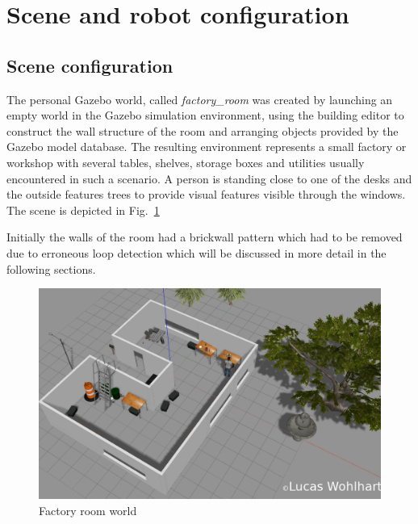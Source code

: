 \documentclass[10pt,journal,compsoc]{IEEEtran}
\begin{document}
\section{Scene and robot configuration}
\subsection{Scene configuration}
The personal Gazebo world, called \textit{factory\_room} was created by launching an empty world in the Gazebo simulation environment, using the building editor to construct the wall structure of the room and arranging objects provided by the Gazebo model database. The resulting environment represents a small factory or workshop with several tables, shelves, storage boxes and utilities usually encountered in such a scenario. A person is standing close to one of the desks and the outside features trees to provide visual features visible through the windows. The scene is depicted in Fig.~\ref{fig:factory_world}

Initially the walls of the room had a brickwall pattern which had to be removed due to erroneous loop detection which will be discussed in more detail in the following sections.

\begin{figure}[thpb]
      \centering
      \includegraphics[width=\linewidth]{img/factory_world.png}
      \caption{Factory room world}
      \label{fig:factory_world}
\end{figure}
\end{document}
